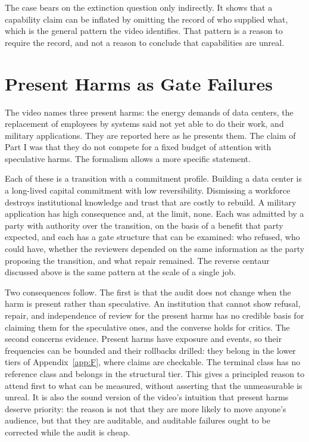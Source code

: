 \documentclass[11pt]{article}
\theoremstyle{definition}
\begin{document}
The case bears on the extinction question only indirectly. It shows that a capability claim can be inflated by omitting the record of who supplied what, which is the general pattern the video identifies. That pattern is a reason to require the record, and not a reason to conclude that capabilities are unreal.

\section{Present Harms as Gate Failures}

The video names three present harms: the energy demands of data centers, the replacement of employees by systems said not yet able to do their work, and military applications. They are reported here as he presents them. The claim of Part I was that they do not compete for a fixed budget of attention with speculative harms. The formalism allows a more specific statement.

Each of these is a transition with a commitment profile. Building a data center is a long-lived capital commitment with low reversibility. Dismissing a workforce destroys institutional knowledge and trust that are costly to rebuild. A military application has high consequence and, at the limit, none. Each was admitted by a party with authority over the transition, on the basis of a benefit that party expected, and each has a gate structure that can be examined: who refused, who could have, whether the reviewers depended on the same information as the party proposing the transition, and what repair remained. The reverse centaur discussed above is the same pattern at the scale of a single job.

Two consequences follow. The first is that the audit does not change when the harm is present rather than speculative. An institution that cannot show refusal, repair, and independence of review for the present harms has no credible basis for claiming them for the speculative ones, and the converse holds for critics. The second concerns evidence. Present harms have exposure and events, so their frequencies can be bounded and their rollbacks drilled: they belong in the lower tiers of Appendix~\ref{app:F}, where claims are checkable. The terminal class has no reference class and belongs in the structural tier. This gives a principled reason to attend first to what can be measured, without asserting that the unmeasurable is unreal. It is also the sound version of the video's intuition that present harms deserve priority: the reason is not that they are more likely to move anyone's audience, but that they are auditable, and auditable failures ought to be corrected while the audit is cheap.
\end{document}
